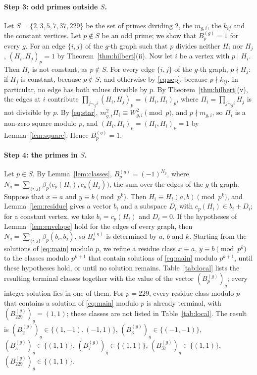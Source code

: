 \documentclass[11pt]{article}
\begin{document}
\paragraph{Step 3: odd primes outside $S$.} Let $S=\{2,3,5,7,37,229\}$ be the set of primes dividing $2$, the $m_{g,i}$, the $k_{ij}$ and the constant vertices. Let $p\notin S$ be an odd prime; we show that $B^{(g)}_p=1$ for every $g$. For an edge $\{i,j\}$ of the $g$-th graph such that $p$ divides neither $H_i$ nor $H_j$, $(H_i,H_j)_p=1$ by Theorem~\ref{thm:hilbert}(ii). Now let $i$ be a vertex with $p\mid H_i$. Then $H_i$ is not constant, as $p\notin S$. For every edge $\{i,j\}$ of the $g$-th graph, $p\nmid H_j$: if $H_j$ is constant, because $p\notin S$, and otherwise by \eqref{eq:sep}, because $p\nmid k_{ij}$. In particular, no edge has both values divisible by $p$. By Theorem~\ref{thm:hilbert}(v), the edges at $i$ contribute $\prod_{j\sim_g i}(H_i,H_j)_p=(H_i,\Pi_i)_p$, where $\Pi_i=\prod_{j\sim_g i}H_j$ is not divisible by $p$. By \eqref{eq:star}, $m_{g,i}^2\Pi_i\equiv W_{g,i}^2\pmod p$, and $p\nmid m_{g,i}$, so $\Pi_i$ is a non-zero square modulo $p$, and $(H_i,\Pi_i)_p=(\Pi_i,H_i)_p=1$ by Lemma~\ref{lem:square}. Hence $B^{(g)}_p=1$.

\paragraph{Step 4: the primes in $S$.} Let $p\in S$. By Lemma~\ref{lem:classes}, $B^{(g)}_p=(-1)^{N_g}$, where $N_g=\sum_{\{i,j\}}\beta_p\bigl(c_p(H_i),c_p(H_j)\bigr)$, the sum over the edges of the $g$-th graph. Suppose that $x\equiv a$ and $y\equiv b\pmod{p^k}$. Then $H_i\equiv H_i(a,b)\pmod{p^k}$, and Lemma~\ref{lem:residue} gives a vector $b_i$ and a subspace $D_i$ with $c_p(H_i)\in b_i+D_i$; for a constant vertex, we take $b_i=c_p(H_i)$ and $D_i=0$. If the hypotheses of Lemma~\ref{lem:envelope} hold for the edges of every graph, then $N_g=\sum_{\{i,j\}}\beta_p(b_i,b_j)$, so $B^{(g)}_p$ is determined by $a$, $b$ and $k$. Starting from the solutions of \eqref{eq:main} modulo $p$, we refine a residue class $x\equiv a$, $y\equiv b\pmod{p^k}$ to the classes modulo $p^{k+1}$ that contain solutions of \eqref{eq:main} modulo $p^{k+1}$, until these hypotheses hold, or until no solution remains. Table~\ref{tab:local} lists the resulting terminal classes together with the value of the vector $(B^{(g)}_p)_g$; every integer solution lies in one of them. For $p=229$, every residue class modulo $p$ that contains a solution of \eqref{eq:main} modulo $p$ is already terminal, with $(B^{(g)}_{229})_g=(1,1)$; these classes are not listed in Table~\ref{tab:local}. The result is $(B^{(g)}_{2})_g\in\{(1,-1),\allowbreak (-1,1)\}$, $(B^{(g)}_{3})_g\in\{(-1,-1)\}$, $(B^{(g)}_{5})_g\in\{(1,1)\}$, $(B^{(g)}_{7})_g\in\{(1,1)\}$, $(B^{(g)}_{37})_g\in\{(1,1)\}$, $(B^{(g)}_{229})_g\in\{(1,1)\}$.
\end{document}
